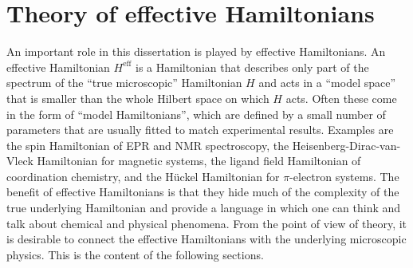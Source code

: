 \section{Theory of effective Hamiltonians}
An important role in this dissertation is played by effective Hamiltonians. An effective Hamiltonian $H^\text{eff}$ is a Hamiltonian that describes only part of the spectrum of the ``true microscopic'' Hamiltonian $H$ and acts in a ``model space'' that is smaller than the whole Hilbert space on which $H$ acts.
Often these come in the form of ``model Hamiltonians'', which are defined by a small number of parameters that are usually fitted to match experimental results. Examples are the spin Hamiltonian of EPR and NMR spectroscopy, the Heisenberg-Dirac-van-Vleck Hamiltonian for magnetic systems, the ligand field Hamiltonian of coordination chemistry, and the Hückel Hamiltonian for $\pi$-electron systems. The benefit of effective Hamiltonians is that they hide much of the complexity of the true underlying Hamiltonian and provide a language in which one can think and talk about chemical and physical phenomena. From the point of view of theory, it is desirable to connect the effective Hamiltonians with the underlying microscopic physics. This is the content of the following sections.
 
